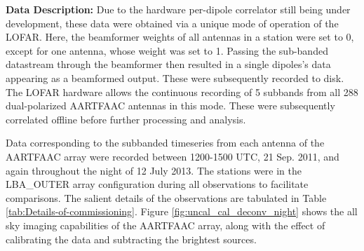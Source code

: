\documentclass{aa}
\begin{document}
\textbf{Data Description:} Due to the hardware per-dipole correlator still being
under development,  these data were obtained  via a unique mode  of operation of
the LOFAR. Here, the beamformer weights of all antennas in a station were set to
0, except  for one antenna, whose weight  was set to 1.   Passing the sub-banded
datastream  through the  beamformer then  resulted  in a  single dipoles's  data
appearing as a beamformed output. These were subsequently recorded to disk. The
LOFAR  hardware allows  the  continuous recording  of  5 subbands  from all  288
dual-polarized  AARTFAAC  antennas  in   this  mode.   These  were  subsequently
correlated offline before further processing and analysis.

Data corresponding to the subbanded timeseries from each antenna of the AARTFAAC
array were  recorded between 1200-1500 UTC,  21 Sep. 2011,  and again throughout
the  night  of  12  July  2013.   The stations  were  in  the  LBA\_OUTER  array
configuration during  all observations  to facilitate comparisons.   The salient
details     of      the     observations     are      tabulated     in     Table
\ref{tab:Details-of-commissioning}.    Figure   \ref{fig:uncal_cal_deconv_night}
shows the  all sky imaging  capabilities of the  AARTFAAC array, along  with the
effect of calibrating the data and subtracting the brightest sources.

\begin{table}[tbh]
\caption{Details of commissioning observations carried out with the AARTFAAC}
\label{tab:Details-of-commissioning}
\end{table}
\end{document}

